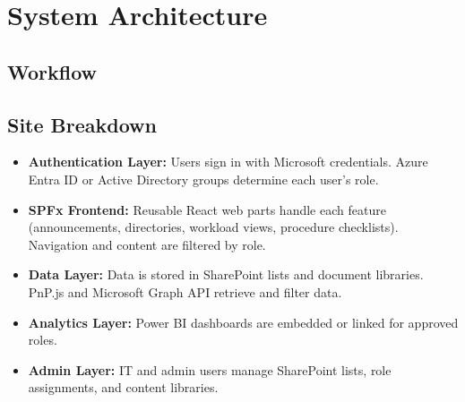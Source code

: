 \documentclass[12pt]{article}
\begin{document}
\section{System Architecture}

\subsection{Workflow}
\begin{center}
\end{center}

\subsection{Site Breakdown}
\begin{itemize}
  \item \textbf{Authentication Layer:} Users sign in with Microsoft credentials. Azure Entra ID or Active Directory groups determine each user's role.
  \item \textbf{SPFx Frontend:} Reusable React web parts handle each feature (announcements, directories, workload views, procedure checklists). Navigation and content are filtered by role.
  \item \textbf{Data Layer:} Data is stored in SharePoint lists and document libraries. PnP.js and Microsoft Graph API retrieve and filter data.
  \item \textbf{Analytics Layer:} Power BI dashboards are embedded or linked for approved roles.
  \item \textbf{Admin Layer:} IT and admin users manage SharePoint lists, role assignments, and content libraries.
\end{itemize}
\end{document}
